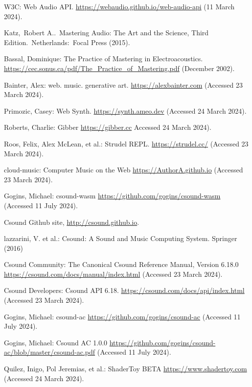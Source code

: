 \documentclass[runningheads,a4paper]{llncs}
\begin{document}
\begin{thebibliography}{4}
 W3C: Web Audio API. \url{https://webaudio.github.io/web-audio-api} (11 March 2024).

 Katz, Robert A.. Mastering Audio: The Art and the Science, Third Edition. Netherlands: Focal Press (2015).

 Bassal, Dominique: The Practice of Mastering in Electroacoustics. \url{https://cec.sonus.ca/pdf/The\_Practice\_of\_Mastering.pdf} (December 2002).

 Bainter, Alex: web. music.
generative art. \url{https://alexbainter.com} (Accessed 23 March 2024).

 Primozic, Casey: Web Synth. \url{https://synth.ameo.dev} (Accessed 24 March 2024).
 
 Roberts, Charlie: Gibber \url{https://gibber.cc} Accessed 24 March 2024).

 Roos, Felix, Alex McLean, et al.: Strudel REPL. \url{https://strudel.cc/} (Accessed 23 March 2024).

 cloud-music: Computer Music on the Web \url{https://AuthorA.github.io} (Accessed 23 March 2024).

 Gogins, Michael: csound-wasm \url{https://github.com/gogins/csound-wasm} (Accessed 11 July 2024).

 Csound Github site, \url{http://csound.github.io}.

 lazzarini, V. et al.: Csound: A Sound and Music Computing System.
Springer (2016)

 Csound Community: The Canonical Csound Reference Manual, Version 6.18.0 \url{https://csound.com/docs/manual/index.html} (Accessed 23 March 2024).

 Csound Developers: Csound API 6.18. \url{https://csound.com/docs/api/index.html} (Accessed 23 March 2024).

 Gogins, Michael: csound-ac \url{https://github.com/gogins/csound-ac} (Accessed 11 July 2024).

 Gogins, Michael: Csound AC 1.0.0 \url{https://github.com/gogins/csound-ac/blob/master/csound-ac.pdf} (Accessed 11 July 2024).

 Quilez, Inigo, Pol Jeremias, et al.: ShaderToy BETA \url{https://www.shadertoy.com} (Accessed 24 March 2024).







\end{thebibliography}
\end{document}
